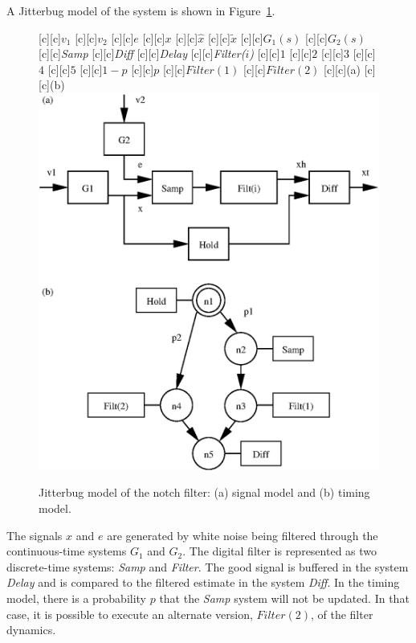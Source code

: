 \documentclass[final,twoside]{rapport}  %
\begin{document}
A {\sc Jitterbug} model of the system is shown in
Figure~\ref{fig:timing2}.
\begin{figure}[tbp]
\centerline{
[c][c]{$v_1$}
[c][c]{$v_2$}
[c][c]{$e$}
[c][c]{$x$}
[c][c]{$\hat x$}
[c][c]{$\tilde x$}
[c][c]{$G_1(s)$}
[c][c]{$G_2(s)$}
[c][c]{\small\em Samp}
[c][c]{\small\em Diff}
[c][c]{\small\em Delay}
[c][c]{\small\em Filter($i$)}
[c][c]{$1$}
[c][c]{$2$}
[c][c]{$3$}
[c][c]{$4$}
[c][c]{$5$}
[c][c]{$1\!-\!p$}
[c][c]{$p$}
[c][c]{\small $\mathit{Filter}(1)$}
[c][c]{\small $\mathit{Filter}(2)$}
[c][c]{\small (a)}
[c][c]{\small (b)}
\includegraphics[scale=0.63]{example2.eps}
}
  \caption{{\sc Jitterbug} model of the notch filter: (a) signal
    model and (b) timing model.}
  \label{fig:timing2}
\end{figure}
The signals $x$ and $e$ are generated by white noise being filtered through
the continuous-time systems $G_1$ and $G_2$. 
The digital filter is represented as two discrete-time systems: {\em Samp}
and {\em Filter}. The good signal is buffered in the system {\em
  Delay} and is compared to the filtered estimate in the system {\em Diff}.
In the timing model, there is a probability $p$ that the {\em Samp}
system will not be updated. In that case, it is possible to execute an
alternate version, $\mathit{Filter}(2)$, of the filter dynamics.
\end{document}
